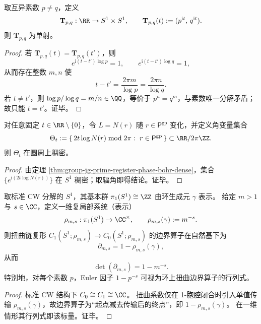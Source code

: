 \begin{theorem}\label{thm:group-jg-two-prime-euler-phase-injective}
取互异素数 \(p\neq q\)，定义
\[
\mathbf T_{p,q}:\RR\to S^1\times S^1,\qquad
\mathbf T_{p,q}(t):=(p^{\mathrm{i}t},\,q^{\mathrm{i}t}).
\]
则 \(\mathbf T_{p,q}\) 为单射。
\end{theorem}
\begin{proof}
若 \(\mathbf T_{p,q}(t)=\mathbf T_{p,q}(t')\)，则
\[
e^{\mathrm{i}(t-t')\log p}=1,\qquad e^{\mathrm{i}(t-t')\log q}=1,
\]
从而存在整数 \(m,n\) 使
\[
t-t'=\frac{2\pi m}{\log p}=\frac{2\pi n}{\log q}.
\]
若 \(t\neq t'\)，则 \(\log p/\log q=m/n\in\QQ\)，等价于 \(p^n=q^m\)，与素数唯一分解矛盾；故只能 \(t=t'\)。证毕。
\end{proof}

\begin{corollary}[寄存器变参实现的谱交叉角扫描稠密性]\label{cor:group-jg-prime-register-phase-scan-dense}
对任意固定 \(t\in\RR\setminus\{0\}\)，令 \(L=N(r)\) 随 \(r\in \mathsf{P}^{\mathrm{gp}}\) 变化，并定义角变量集合
\[
\Theta_t:=\{\,2t\log N(r)\bmod 2\pi:\ r\in \mathsf{P}^{\mathrm{gp}}\,\}\subset \RR/2\pi\ZZ.
\]
则 \(\Theta_t\) 在圆周上稠密。
\end{corollary}
\begin{proof}
由定理 \ref{thm:group-jg-prime-register-phase-bohr-dense}，集合 \(\{e^{\mathrm{i}(2t\log N(r))}\}\) 在 \(S^1\) 稠密；取辐角即得结论。证毕。
\end{proof}

\begin{theorem}\label{thm:group-jg-euler-factor-determinant-local-system}
取标准 CW 分解的 \(S^1\)，其基本群 \(\pi_1(S^1)\cong\ZZ\) 由环生成元 \(\gamma\) 表示。
给定 \(m>1\) 与 \(s\in\CC\)，定义一维复局部系统（表示）
\[
\rho_{m,s}:\pi_1(S^1)\to\CC^\times,\qquad \rho_{m,s}(\gamma):=m^{-s}.
\]
则扭曲链复形 \(C_1(S^1;\rho_{m,s})\to C_0(S^1;\rho_{m,s})\) 的边界算子在自然基下为
\[
\partial_{m,s}=1-\rho_{m,s}(\gamma),
\]
从而
\[
\det(\partial_{m,s})=1-m^{-s}.
\]
特别地，对每个素数 \(p\)，Euler 因子 \(1-p^{-s}\) 可视为环上扭曲边界算子的行列式。
\end{theorem}
\begin{proof}
标准 CW 结构下 \(C_0\cong C_1\cong\CC\)。
扭曲系数仅在 1-胞腔闭合时引入单值传输 \(\rho_{m,s}(\gamma)\)，故边界算子为“起点减去传输后的终点”，即 \(1-\rho_{m,s}(\gamma)\)。
在一维情形其行列式即该标量。证毕。
\end{proof}

